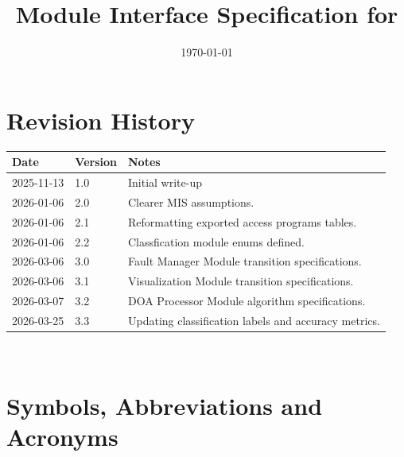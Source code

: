 \documentclass[12pt, titlepage]{article}
\begin{document}
\title{Module Interface Specification for \progname{}}

\author{\authname}

\date{\today}

\maketitle


\section{Revision History}

\begin{tabularx}{\textwidth}{p{3cm}p{2cm}X} \toprule {\bf Date} & {\bf Version}
& {\bf Notes}\\
\midrule
2025-11-13 & 1.0 & Initial write-up\\
2026-01-06 & 2.0 & Clearer MIS assumptions.\\
2026-01-06 & 2.1 & Reformatting exported access programs tables.\\
2026-01-06 & 2.2 & Classfication module enums defined.\\
2026-03-06 & 3.0 & Fault Manager Module transition specifications.\\
2026-03-06 & 3.1 & Visualization Module transition specifications.\\
2026-03-07 & 3.2 & DOA Processor Module algorithm specifications.\\
2026-03-25 & 3.3 & Updating classification labels and accuracy metrics.\\
\bottomrule
\end{tabularx}

~\newpage

\section{Symbols, Abbreviations and Acronyms}
\end{document}
